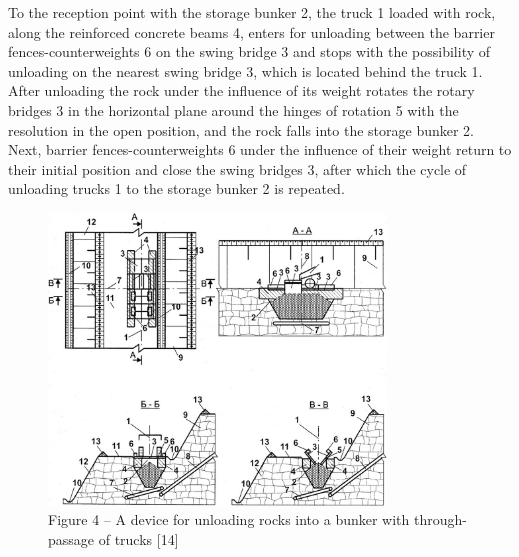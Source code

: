 \begin{multicols}{2}
To the reception point with the storage bunker 2, the truck 1 loaded
with rock, along the reinforced concrete beams 4, enters for unloading
between the barrier fences-counterweights 6 on the swing bridge 3 and
stops with the possibility of unloading on the nearest swing bridge 3,
which is located behind the truck 1. After unloading the rock under the
influence of its weight rotates the rotary bridges 3 in the horizontal
plane around the hinges of rotation 5 with the resolution in the open
position, and the rock falls into the storage bunker 2. Next, barrier
fences-counterweights 6 under the influence of their weight return to
their initial position and close the swing bridges 3, after which the
cycle of unloading trucks 1 to the storage bunker 2 is repeated.
\end{multicols}

\begin{figure}[H]
	\centering
	\includegraphics[width=0.8\textwidth]{assets/1353}
	\caption*{Figure 4 -- A device for unloading rocks into a bunker with through-passage of trucks {[}14{]}}
\end{figure}

